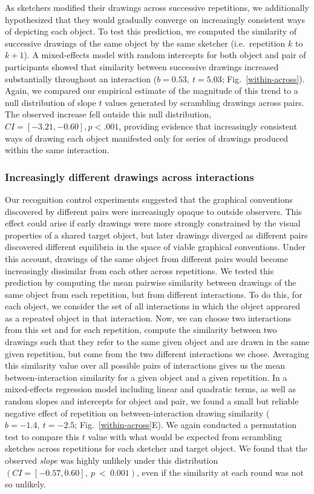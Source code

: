 \documentclass[10pt,letterpaper]{article}
\begin{document}
As sketchers modified their drawings across successive repetitions, we additionally hypothesized that they would gradually converge on increasingly consistent ways of depicting each object.
To test this prediction, we computed the similarity of successive drawings of the same object by the same sketcher (i.e.~repetition $k$ to $k+1$). %
A mixed-effects model with random intercepts for both object and pair of participants showed that similarity between successive drawings increased substantially throughout an interaction ($b = 0.53,~t = 5.03$; Fig.~\ref{within-across}).
Again, we compared our empirical estimate of the magnitude of this trend to a null distribution of slope $t$ values generated by scrambling drawings across pairs.%
The observed increase fell outside this null distribution, $CI = [-3.21, -0.60], p < .001$, providing evidence that increasingly consistent ways of drawing each object manifested only for series of drawings produced within the same interaction.

\subsubsection{Increasingly different drawings across interactions}

Our recognition control experiments suggested that the graphical conventions discovered by different pairs were increasingly opaque to outside observers.
This effect could arise if early drawings were more strongly constrained by the visual properties of a shared target object, but later drawings diverged as different pairs discovered different equilibria in the space of viable graphical conventions.
Under this account, drawings of the same object from different pairs would become increasingly dissimilar from each other across repetitions.
We tested this prediction by computing the mean pairwise similarity between drawings of the same object from each repetition, but from different interactions.
To do this, for each object, we consider the set of all interactions in which the object appeared as a repeated object in that interaction. Now, we can choose two interactions from this set and for each repetition, compute the similarity between two drawings such that they refer to the same given object and are drawn in the same given repetition, but come from the two different interactions we chose. Averaging this similarity value over all possible pairs of interactions gives us the mean between-interaction similarity for a given object and a given repetition.
In a mixed-effects regression model including linear and quadratic terms, as well as random slopes and intercepts for object and pair, we found a small but reliable negative effect of repetition on between-interaction drawing similarity ($b = -1.4, ~t = -2.5$; Fig.~\ref{within-across}E). %
We again conducted a permutation test to compare this $t$ value with what would be expected from scrambling sketches across repetitions for each sketcher and target object.
We found that the observed \emph{slope} was highly unlikely under this distribution $(CI = [-0.57, 0.60],~p~<~0.001)$, even if the similarity at each round was not so unlikely.
\end{document}
